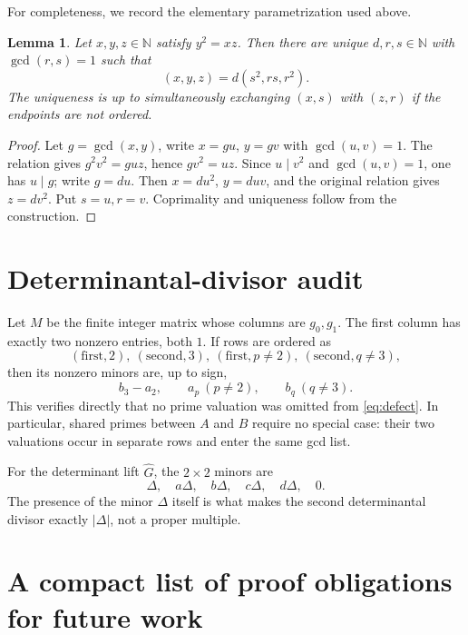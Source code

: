 \documentclass[11pt]{article}
\numberwithin{equation}{section}
\newtheorem{lemma}[theorem]{Lemma}
\theoremstyle{definition}
\newcommand{\N}{\mathbb{N}}
\begin{document}
For completeness, we record the elementary parametrization used above.

\begin{lemma}\label{lem:paramhankel}
Let \(x,y,z\in\N\) satisfy \(y^2=xz\). Then there are unique \(d,r,s\in\N\) with \(\gcd(r,s)=1\) such that
\[
       (x,y,z)=d(s^2,rs,r^2).
\]
The uniqueness is up to simultaneously exchanging \((x,s)\) with \((z,r)\) if the endpoints are not ordered.
\end{lemma}

\begin{proof}
Let \(g=\gcd(x,y)\), write \(x=gu\), \(y=gv\) with \(\gcd(u,v)=1\). The relation gives \(g^2v^2=guz\), hence \(gv^2=uz\). Since \(u\mid v^2\) and \(\gcd(u,v)=1\), one has \(u\mid g\); write \(g=du\). Then \(x=du^2\), \(y=duv\), and the original relation gives \(z=dv^2\). Put \(s=u,r=v\). Coprimality and uniqueness follow from the construction.
\end{proof}

\section{Determinantal-divisor audit}

Let \(M\) be the finite integer matrix whose columns are \(g_0,g_1\). The first column has exactly two nonzero entries, both \(1\). If rows are ordered as
\[
 (\text{first},2),\ (\text{second},3),\
 (\text{first},p\ne2),\ (\text{second},q\ne3),
\]
then its nonzero minors are, up to sign,
\[
       b_3-a_2,\qquad a_p\ (p\ne2),\qquad b_q\ (q\ne3).
\]
This verifies directly that no prime valuation was omitted from \eqref{eq:defect}. In particular, shared primes between \(A\) and \(B\) require no special case: their two valuations occur in separate rows and enter the same gcd list.

For the determinant lift \(\widehat G\), the \(2\times2\) minors are
\[
       \Delta,
       \quad a\Delta,\quad b\Delta,\quad c\Delta,\quad d\Delta,
       \quad 0.
\]
The presence of the minor \(\Delta\) itself is what makes the second determinantal divisor exactly \(|\Delta|\), not a proper multiple.

\section{A compact list of proof obligations for future work}
\end{document}
